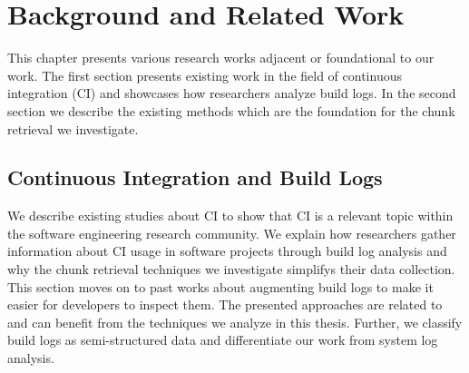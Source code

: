 \documentclass[\myrootdir/main.tex]{subfiles}
\begin{document}
\chapter{Background and Related Work}
\label{sec:rw}
This chapter presents various research works adjacent or foundational to our work.
The first section presents existing work in the field of continuous integration (CI) and showcases how researchers analyze build logs.
In the second section we describe the existing methods which are the foundation for the chunk retrieval we investigate.

\section{Continuous Integration and Build Logs}
We describe existing studies about CI to show that CI is a relevant topic within the software engineering research community.
We explain how researchers gather information about CI usage in software projects through build log analysis and why the chunk retrieval techniques we investigate simplifys their data collection.
This section moves on to past works about augmenting build logs to make it easier for developers to inspect them.
The presented approaches are related to and can benefit from the techniques we analyze in this thesis.
Further, we classify build logs as semi-structured data and differentiate our work from system log analysis.





\end{document}
